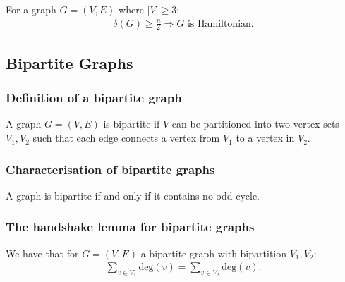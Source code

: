 \documentclass[a4paper, 12pt, twoside]{article}
\begin{document}
For a graph $G = (V, E)$ where $|V| \geq 3$: \begin{gather*}
  \delta(G) \geq \frac{n}{2} \Rightarrow G \text{ is Hamiltonian.}
\end{gather*}

\subsection{Bipartite Graphs}

\subsubsection{Definition of a bipartite graph}

A graph $G = (V, E)$ is bipartite if $V$ can be partitioned into
two vertex sets $V_1, V_2$ such that each edge connects a vertex
from $V_1$ to a vertex in $V_2$.

\subsubsection{Characterisation of bipartite graphs}

A graph is bipartite if and only if it contains no odd cycle.

\subsubsection{The handshake lemma for bipartite graphs}

We have that for $G = (V, E)$ a bipartite graph with bipartition
$V_1, V_2$: \begin{gather*}
  \sum_{v \in V_1} \text{deg}(v) = \sum_{v \in V_2} \text{deg}(v). \\
\end{gather*}
\end{document}
